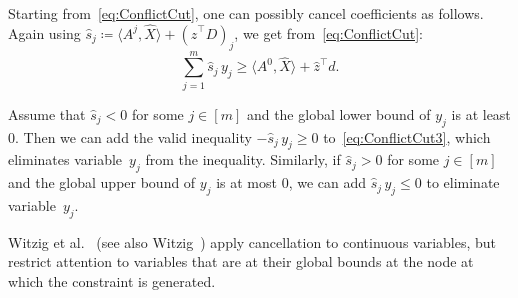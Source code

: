 \documentclass[10pt, a4paper]{article}
\newcommand{\define}{\coloneqq}
\newcommand{\skal}[2]{\langle{#1},{#2}\rangle}
\newcommand{\T}{^{\top}}
\begin{document}
Starting from~\eqref{eq:ConflictCut}, one can possibly cancel coefficients
as follows. Again using
$\hat{s}_j \define \skal{A^j}{\hat{X}} + (\hat{z}\T D)_j$, we get
from~\eqref{eq:ConflictCut}:
\begin{equation}\label{eq:ConflictCut3}
  \sum_{j=1}^m \hat{s}_j\, y_j \geq \skal{A^0}{\hat{X}} + \hat{z}\T d.
\end{equation}

Assume that $\hat{s}_j < 0$ for some $j \in [m]$ and the global lower bound
of $y_j$ is at least 0. Then we can add the valid inequality
$-\hat{s}_j\, y_j \geq 0$ to~\eqref{eq:ConflictCut3}, which eliminates
variable~$y_j$ from the inequality. Similarly, if $\hat{s}_j > 0$ for some
$j \in [m]$ and the global upper bound of $y_j$ is at most 0, we can add
$\hat{s}_j\, y_j \leq 0$ to eliminate variable~$y_j$.

Witzig et al.~\cite{WitBH17} (see also Witzig~\cite{Wit22}) apply
cancellation to continuous variables, but restrict attention to variables
that are at their global bounds at the node at which the constraint is
generated.


\begin{small}
   
   
\end{small}
\end{document}
